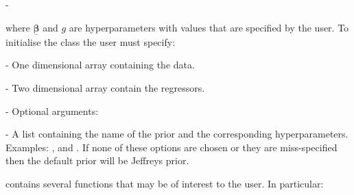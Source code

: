 -\documentclass[article]{jss}
\begin{document}
where $\bm{\underline{\beta}}$ and $g$ are hyperparameters with values
that are specified by the user. To initialise the class
 the user must specify:
\begin{description}
\item {} - One dimensional  array containing the
  data.
\item {} - Two dimensional  array contain the
  regressors.
\item {} - Optional arguments:

  \begin{description}
  \item {} - A list containing the name of the prior and the
    corresponding hyperparameters. Examples: \newline
     ,\newline
     and \newline
    . \newline
    If none of these options are chosen or they are
    miss-specified then the default prior will be Jeffreys prior.
  \end{description}
\end{description}
 contains several functions that may be of
interest to the user. In particular:
\end{document}
